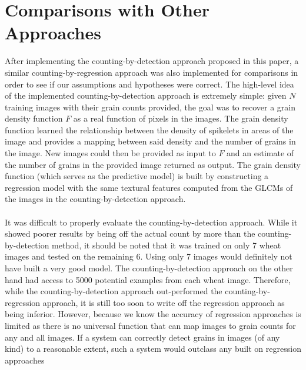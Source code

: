 \section{Comparisons with Other Approaches}
After implementing the counting-by-detection approach proposed in this paper, a similar counting-by-regression approach was also implemented for comparisons in order to see if our assumptions and hypotheses were correct. The high-level idea of the implemented counting-by-detection approach is extremely simple: given $N$ training images with their grain counts provided, the goal was to recover a grain density function $F$ as a real function of pixels in the images. The grain density function learned the relationship between the density of spikelets in areas of the image and provides a mapping between said density and the number of grains in the image. New images could then be provided as input to $F$ and an estimate of the number of grains in the provided image returned as output. The grain density function (which serves as the predictive model) is built by constructing a regression model with the same textural features computed from the GLCMs of the images in the counting-by-detection approach.\\ \\
%
It was difficult to properly evaluate the counting-by-detection approach. While it showed poorer results by being off the actual count by more than the counting-by-detection method, it should be noted that it was trained on only 7 wheat images and tested on the remaining 6. Using only 7 images would definitely not have built a very good model. The counting-by-detection approach on the other hand had access to 5000 potential examples from each wheat image. Therefore, while the counting-by-detection approach out-performed the counting-by-regression approach, it is still too soon to write off the regression approach as being inferior. However, because we know the accuracy of regression approaches is limited as there is no universal function that can map images to grain counts for any and all images. If a system can correctly detect grains in images (of any kind) to a reasonable extent, such a system would outclass any built on regression approaches\\ \\
%
